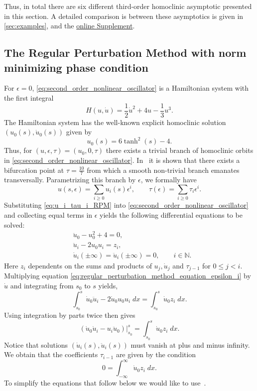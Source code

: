 Thus, in total there are six different third-order homoclinic asymptotic
presented in this section. A detailed comparison is between these asymptotics
is given in \cref{sec:examples}, and the \hyperref[mysupplement]{online
Supplement}.

\subsection{The Regular Perturbation Method with norm minimizing phase condition}
\label{sec:RPM_norm_minimizing_phase condition}
For $\epsilon=0$, \cref{eq:second_order_nonlinear_oscillator} is a Hamiltonian
system with the first integral
\begin{equation*}
    H(u,\dot u) = \frac12 \dot u^2+4u-\frac13 u^3.
\end{equation*}
The Hamiltonian system has the well-known explicit homoclinic solution
$(u_0(s),\dot u_0(s))$ given by
\[
    u_{0}(s) = 6 \tanh^2(s) - 4.
\]
Thus, for $(u, \epsilon, \tau) = (u_0, 0, \tau)$ there exists a trivial branch
of homoclinic orbits in \cref{eq:second_order_nonlinear_oscillator}.
In~\cite{Beyn_1994} it is shown that there exists a bifurcation point at
$\tau=\frac{10}{7}$ from which a smooth non-trivial branch emanates
transversally. Parametrizing this branch by $\epsilon$, we formally have
\begin{equation}
    \label{eq:u_i_tau_i_RPM}
    u(s,\epsilon) = \sum_{i\geq 0} u_i(s) \epsilon^i, 
    \qquad 
    \tau(\epsilon) = \sum_{i\geq 0} \tau_i \epsilon^i.
\end{equation}
Substituting \cref{eq:u_i_tau_i_RPM} into
\cref{eq:second_order_nonlinear_oscillator} and collecting equal terms in
$\epsilon$ yields the following differential equations to be solved:
\begin{align}
  &\ddot u_0 - u_0^2 +4 = 0, \label{eq:z0} \\
  &\ddot u_i - 2 u_0 u_i
    =
    z_i, 
        \label{eq:regular_perturbation_method_equation_epsilon_i} \\
  &\dot u_i (\pm \infty) = \ddot u_i (\pm \infty) = 0,
        \qquad i\in \mathbb N. \nonumber
\end{align}
Here $z_i$ dependents on the sums and products of $u_j, \dot u_j$ and $\tau_{j-1}$
for $0\leq j < i$.  Multiplying equation
\cref{eq:regular_perturbation_method_equation_epsilon_i} by $\dot u$ and
integrating from $s_0$ to $s$ yields,
\[
  \int_{s_0}^s \dot u_0 \ddot u_i - 2 \dot u_0 u_0 u_i \;dx = \int_{s_0}^s \dot
  u_0 z_i \; dx.
\]
Using integration by parts twice then gives
\begin{equation}
  \label{eq:regular_perturbation_method_integration_by_parts}
  \left. \left( \dot u_0 \dot u_i - u_i \ddot u_0 \right)\right|_{s_0}^s = \int_{s_0}^s \dot
  u_0 z_i \; dx.
\end{equation}
Notice that solutions $(\dot u_i(s),\ddot u_i(s))$ must vanish at plus and minus
infinity. We obtain that the coefficients $\tau_{i-1}$ are given by the condition
\begin{equation*}
    0 = \int_{-\infty}^\infty \dot u_0 z_i \; dx.
\end{equation*}
To simplify the equations that follow below we would like to
use~\cite[Proposition 4.2]{Beyn_1994}. 

